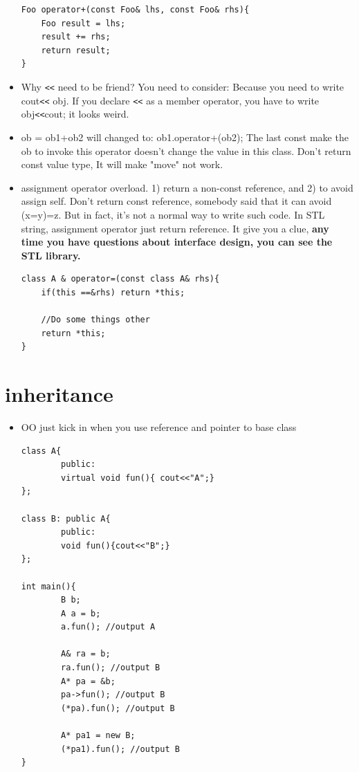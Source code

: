 \documentclass[a4paper,11pt,twoside]{book}
\begin{document}
\begin{itemize}
\begin{lstlisting}[numbers=none]
Foo operator+(const Foo& lhs, const Foo& rhs){
	Foo result = lhs;
	result += rhs;
	return result;
}
\end{lstlisting}
	
	\item Why \verb=<<= need to be friend? You need to consider:  Because you need to write cout\verb=<<= obj. If you declare \verb=<<= as a member operator, you have to write obj\verb=<<=cout; it looks weird.
	
	\item ob = ob1+ob2 will changed to:  ob1.operator+(ob2);  The last const make the ob to invoke this operator doesn't change the value in this class. Don't return const value type, It will make "move" not work.
	
	\item assignment operator overload. 1) return a non-const reference, and 2) to avoid assign self. Don't return const reference, somebody said that it can avoid (x=y)=z. But in fact, it's not a normal way to write such code. In STL string, assignment operator just return reference. It give you a clue, \textbf{any time you have questions about interface design, you can see the STL library.}
\begin{lstlisting}[numbers=none]
class A & operator=(const class A& rhs){
	if(this ==&rhs) return *this;
	
	//Do some things other
	return *this;
}
\end{lstlisting}
	
\end{itemize}


\section{inheritance}
\begin{itemize}
	\item OO just kick in when you use reference and pointer to base class
\begin{lstlisting}[numbers=none]
class A{
		public:
		virtual void fun(){ cout<<"A";}
};
	
class B: public A{
		public:
		void fun(){cout<<"B";}
};
	
int main(){
		B b;
		A a = b;
		a.fun(); //output A
		
		A& ra = b;
		ra.fun(); //output B
		A* pa = &b;
		pa->fun(); //output B
		(*pa).fun(); //output B
		
		A* pa1 = new B;
		(*pa1).fun(); //output B
}
\end{lstlisting}
\end{itemize}
\end{document}
